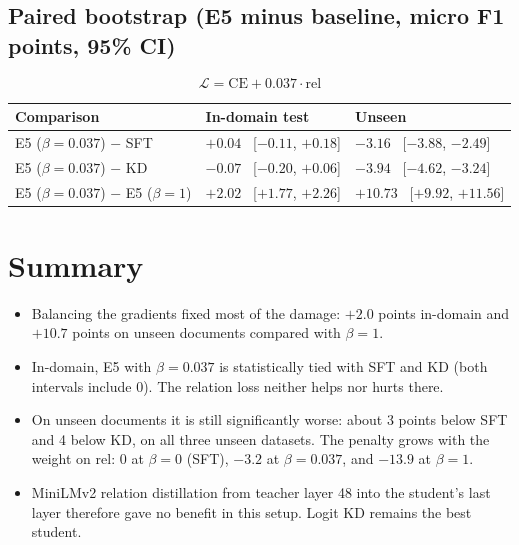 \documentclass[10pt]{article}
\newcommand{\losssmall}{\[ \mathcal{L} = \mathrm{CE} + 0.037 \cdot \mathrm{rel} \]}
\begin{document}
\subsection*{Paired bootstrap (E5 minus baseline, micro F1 points, 95\% CI)}
\losssmall
\begin{center}
\begin{tabular}{lll}
\toprule
Comparison & In-domain test & Unseen \\
\midrule
E5 ($\beta = 0.037$) $-$ SFT & $+0.04$ \ [$-0.11$, $+0.18$] & $-3.16$ \ [$-3.88$, $-2.49$] \\
E5 ($\beta = 0.037$) $-$ KD & $-0.07$ \ [$-0.20$, $+0.06$] & $-3.94$ \ [$-4.62$, $-3.24$] \\
E5 ($\beta = 0.037$) $-$ E5 ($\beta = 1$) & $+2.02$ \ [$+1.77$, $+2.26$] & $+10.73$ \ [$+9.92$, $+11.56$] \\
\bottomrule
\end{tabular}
\end{center}

\section*{Summary}

\begin{itemize}
  \item Balancing the gradients fixed most of the damage: $+2.0$ points in-domain and $+10.7$ points on unseen documents compared with $\beta = 1$.
  \item In-domain, E5 with $\beta = 0.037$ is statistically tied with SFT and KD (both intervals include 0). The relation loss neither helps nor hurts there.
  \item On unseen documents it is still significantly worse: about 3 points below SFT and 4 below KD, on all three unseen datasets. The penalty grows with the weight on rel: 0 at $\beta = 0$ (SFT), $-3.2$ at $\beta = 0.037$, and $-13.9$ at $\beta = 1$.
  \item MiniLMv2 relation distillation from teacher layer 48 into the student's last layer therefore gave no benefit in this setup. Logit KD remains the best student.
\end{itemize}
\end{document}
